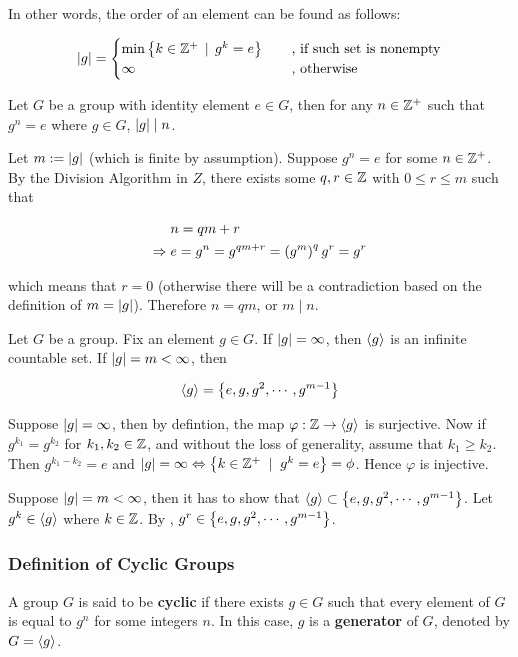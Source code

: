 \documentclass[a4paper,12pt]{article}
\begin{document}
In other words, the order of an element can be found as follows:

$$\left| g\right|=\begin{cases}
  \min\left\{ k\in\mathbb{Z}^{+}\,\mid\, g^{k}=e\right\}&\;\;\;\;\text{, if such set is nonempty}\\
  \infty &\;\;\;\;\text{, otherwise}
\end{cases}$$\s

\begin{pst}
  Let $G$ be a group with identity element $e\in G$, then for any $n\in\mathbb{Z}^{+}$ such that $g^{n}=e$ where $g\in G$, $\left| g\right|\mid n$.\n

  \prf Let $m:=\left| g\right|$ (which is finite by assumption). Suppose $g^{n}=e$ for some $n\in\mathbb{Z}^{+}$. By the Division Algorithm in $Z$, there exists some $q,r\in\mathbb{Z}$ with $0\leq r\leq m$ such that

  $$\begin{aligned}[t]
    &n=qm+r\\
    \Rightarrow\; &e=g^{n}=g^{qm+r}=\left( g^{m}\right)^{q}g^{r}=g^{r}
  \end{aligned}$$\s

  which means that $r=0$ (otherwise there will be a contradiction based on the definition of $m=\left| g\right|$). Therefore $n=qm$, or $m\mid n$.
\end{pst}\n

\begin{thm}
  Let $G$ be a group. Fix an element $g\in G$. If $\left| g\right|=\infty$, then $\left\langle g\right\rangle$ is an infinite countable set. If $\left| g\right|=m<\infty$, then

  $$\left\langle g\right\rangle=\left\{ e,g,g^{2},\cdots,g^{m-1}\right\}$$\s

  \prf Suppose $\left| g\right|=\infty$, then by defintion, the map $\varphi:\mathbb{Z}\rightarrow\left\langle g\right\rangle$ is surjective. Now if $g^{k_{1}}=g^{k_{2}}$ for $k_{1},k_{2}\in\mathbb{Z}$, and without the loss of generality, assume that $k_{1}\geq k_{2}$. Then $g^{k_{1}-k_{2}}=e$ and $\left| g\right|=\infty\Leftrightarrow\left\{ k\in\mathbb{Z}^{+}\;\mid\; g^{k}=e\right\}=\phi$. Hence $\varphi$ is injective.\n

  Suppose $\left| g\right|=m<\infty$, then it has to show that $\left\langle g\right\rangle\subset\left\{ e,g,g^{2},\cdots,g^{m-1}\right\}$. Let $g^{k}\in\left\langle g\right\rangle$ where $k\in\mathbb{Z}$. By \rpst[\sctd{1}], $g^{r}\in\left\{ e,g,g^{2},\cdots,g^{m-1}\right\}$.
\end{thm}

\subsubsection{Definition of Cyclic Groups}
\begin{dft}
  A group $G$ is said to be \textbf{cyclic} if there exists $g\in G$ such that every element of $G$ is equal to $g^{n}$ for some integers $n$. In this case, $g$ is a \textbf{generator} of $G$, denoted by $G=\left\langle g\right\rangle$.
\end{dft}\n
\end{document}
